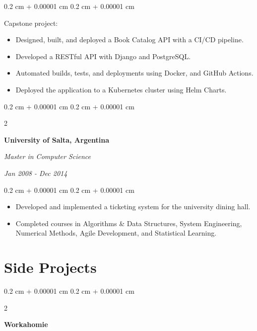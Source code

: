 \documentclass[10pt, letterpaper]{article}
\newenvironment{highlights}{
    \begin{itemize}[
        topsep=0.10 cm,
        parsep=0.10 cm,
        partopsep=0pt,
        itemsep=0pt,
        leftmargin=0.4 cm + 10pt
    ]
}{
    \end{itemize}
} %
\newenvironment{onecolentry}{
    \begin{adjustwidth}{
        0.2 cm + 0.00001 cm
    }{
        0.2 cm + 0.00001 cm
    }
}{
    \end{adjustwidth}
} %
\newenvironment{twocolentry}[2][]{
    \onecolentry
    \def\secondColumn{#2}
    \setcolumnwidth{\fill, 4.5 cm}
    \begin{paracol}{2}
}{
    \switchcolumn \raggedleft \secondColumn
    \end{paracol}
    \endonecolentry
} %
\let\hrefWithoutArrow\href
\renewcommand{\href}[2]{\hrefWithoutArrow{#1}{\ifthenelse{\equal{#2}{}}{ }{#2 }\raisebox{.15ex}{\footnotesize \faExternalLink*}}}
\begin{document}
        \vspace{0.10 cm}
        \begin{onecolentry}
        Capstone project:
            \begin{highlights}
                \item Designed, built, and deployed a Book Catalog API with a CI/CD pipeline.
                \item Developed a RESTful API with Django and PostgreSQL.
                \item Automated builds, tests, and deployments using Docker, and GitHub Actions.
                \item Deployed the application to a Kubernetes cluster using Helm Charts.
            \end{highlights}
        \end{onecolentry}

        \vspace{0.2 cm}


        \begin{twocolentry}{
        \textit{Jan 2008 - Dec 2014}}
            \textbf{University of Salta, Argentina}

            \textit{Master in Computer Science}
        \end{twocolentry}

        \vspace{0.10 cm}
        \begin{onecolentry}
            \begin{highlights}
                \item Developed and implemented a ticketing system for the university dining hall.
                \item Completed courses in Algorithms \& Data Structures, System Engineering, Numerical Methods, Agile Development, and Statistical Learning.
            \end{highlights}
        \end{onecolentry}


    
    \section{Side Projects}



        
        \begin{twocolentry}{
            
            
        \textit{\href{https://javieroc.github.io/workahomie/}{github}}}
            \textbf{Workahomie}
        \end{twocolentry}
\end{document}
